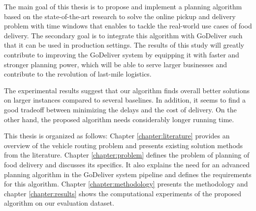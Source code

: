 The main goal of this thesis is to propose and implement a planning algorithm based on the state-of-the-art research to solve the online pickup and delivery problem with time windows that enables to tackle the real-world use cases of food delivery. The secondary goal is to integrate this algorithm with GoDeliver such that it can be used in production settings. The results of this study will greatly contribute to improving the GoDeliver system by equipping it with faster and stronger planning power, which will be able to serve larger businesses and contribute to the revolution of last-mile logistics.

The experimental results suggest that our algorithm finds overall better solutions on larger instances compared to several baselines. In addition, it seems to find a good tradeoff between minimizing the delays and the cost of delivery. On the other hand, the proposed algorithm needs considerably longer running time.

This thesis is organized as follows: Chapter \ref{chapter:literature} provides an overview of the vehicle routing problem and presents existing solution methods from the literature. Chapter \ref{chapter:problem} defines the problem of planning of food delivery and discusses its specifics. It also explains the need for an advanced planning algorithm in the GoDeliver system pipeline and defines the requirements for this algorithm. Chapter \ref{chapter:methodology} presents the methodology and chapter \ref{chapter:results} shows the computational experiments of the proposed algorithm on our evaluation dataset.
